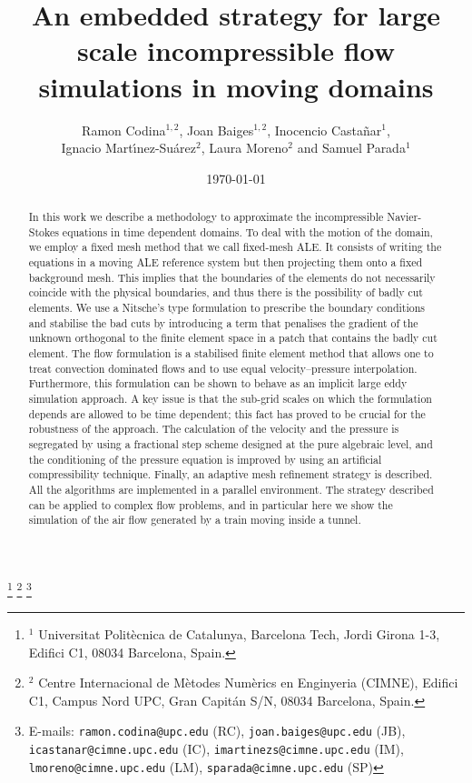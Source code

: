 \documentclass[11pt,a4paper,oneside,reqno]{amsart}
\begin{document}
\author{
Ramon Codina$^{1,2}$, Joan Baiges$^{1,2}$, 
Inocencio Casta\~nar$^{1}$, \\ Ignacio Mart\'\i nez-Su\'arez$^{2}$, Laura Moreno$^{2}$ and Samuel Parada$^{1}$
}
\title[R. Codina et al.]{
An embedded strategy for large scale incompressible flow simulations in moving domains}
\date{\today}
\thanks{$^1$ Universitat Polit\`ecnica de Catalunya, Barcelona Tech, Jordi
Girona 1-3, Edifici C1, 08034 Barcelona, Spain.}
\thanks{$^2$ Centre Internacional de M\`etodes Num\`erics en Enginyeria (CIMNE),
Edifici C1, Campus Nord UPC, Gran Capit\'an S/N, 08034 Barcelona, Spain.}
\thanks{E-mails: 
{\tt ramon.codina@upc.edu} (RC),
{\tt joan.baiges@upc.edu} (JB),
{\tt icastanar@cimne.upc.edu} (IC),
{\tt imartinezs@cimne.upc.edu} (IM),
{\tt lmoreno@cimne.upc.edu} (LM),
{\tt sparada@cimne.upc.edu} (SP)
}
\begin{abstract}
In this work we describe a methodology to approximate the incompressible Navier-Stokes equations in time dependent domains. To deal with the motion of the domain, we employ a fixed mesh method that we call fixed-mesh ALE. It consists of writing the equations in a moving ALE reference system but then projecting them onto a fixed background mesh. This implies that the boundaries of the elements do not necessarily coincide with the physical boundaries, and thus there is the possibility of badly cut elements. We use a Nitsche's type formulation to prescribe the boundary conditions and stabilise the bad cuts by introducing a term that penalises the gradient of the unknown orthogonal to the finite element space in a patch that contains the badly cut element. The flow formulation is a stabilised finite element method that allows one to treat convection dominated flows and to use equal velocity--pressure interpolation. Furthermore, this formulation can be shown to behave as an implicit large eddy simulation approach. A key issue is that the sub-grid scales on which the formulation depends are allowed to be time dependent; this fact has proved to be crucial for the robustness of the approach. The calculation of the velocity and the pressure is segregated by using a fractional step scheme designed at the pure algebraic level, and the conditioning of the pressure equation is improved by using an artificial compressibility technique. Finally, an adaptive mesh refinement strategy is described. All the algorithms are implemented in a parallel environment. The strategy described can be applied to complex flow problems, and in particular here we show the simulation of the air flow generated by a train moving inside a tunnel.
\end{abstract}
\maketitle
{}
\end{document}
